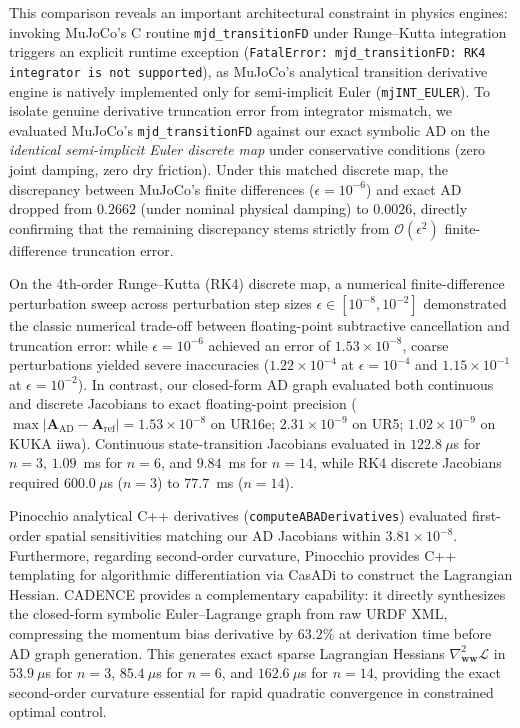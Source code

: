 \documentclass[fleqn,10pt]{article}
\begin{document}
This comparison reveals an important architectural constraint in physics engines: invoking MuJoCo's C routine \texttt{mjd\_transitionFD} under Runge--Kutta integration triggers an explicit runtime exception (\texttt{FatalError: mjd\_transitionFD: RK4 integrator is not supported}), as MuJoCo's analytical transition derivative engine is natively implemented only for semi-implicit Euler (\texttt{mjINT\_EULER}). To isolate genuine derivative truncation error from integrator mismatch, we evaluated MuJoCo's \texttt{mjd\_transitionFD} against our exact symbolic AD on the \textit{identical semi-implicit Euler discrete map} under conservative conditions (zero joint damping, zero dry friction). Under this matched discrete map, the discrepancy between MuJoCo's finite differences ($\epsilon = 10^{-6}$) and exact AD dropped from $0.2662$ (under nominal physical damping) to $0.0026$, directly confirming that the remaining discrepancy stems strictly from $\mathcal{O}(\epsilon^2)$ finite-difference truncation error.

On the 4th-order Runge--Kutta (RK4) discrete map, a numerical finite-difference perturbation sweep across perturbation step sizes $\epsilon \in [10^{-8}, 10^{-2}]$ demonstrated the classic numerical trade-off between floating-point subtractive cancellation and truncation error: while $\epsilon = 10^{-6}$ achieved an error of $1.53 \times 10^{-8}$, coarse perturbations yielded severe inaccuracies ($1.22 \times 10^{-4}$ at $\epsilon = 10^{-4}$ and $1.15 \times 10^{-1}$ at $\epsilon = 10^{-2}$). In contrast, our closed-form AD graph evaluated both continuous and discrete Jacobians to exact floating-point precision ($\max |\bm{A}_{\text{AD}} - \bm{A}_{\text{ref}}| = 1.53 \times 10^{-8}$ on UR16e; $2.31 \times 10^{-9}$ on UR5; $1.02 \times 10^{-9}$ on KUKA iiwa). Continuous state-transition Jacobians evaluated in $122.8~\mu$s for $n=3$, $1.09$~ms for $n=6$, and $9.84$~ms for $n=14$, while RK4 discrete Jacobians required $600.0~\mu$s ($n=3$) to $77.7$~ms ($n=14$).

Pinocchio analytical C++ derivatives (\texttt{computeABADerivatives}) evaluated first-order spatial sensitivities matching our AD Jacobians within $3.81 \times 10^{-8}$. Furthermore, regarding second-order curvature, Pinocchio provides C++ templating for algorithmic differentiation via CasADi to construct the Lagrangian Hessian. CADENCE provides a complementary capability: it directly synthesizes the closed-form symbolic Euler--Lagrange graph from raw URDF XML, compressing the momentum bias derivative by $63.2\%$ at derivation time before AD graph generation. This generates exact sparse Lagrangian Hessians $\nabla_{\bm{w}\bm{w}}^2 \mathcal{L}$ in $53.9~\mu$s for $n=3$, $85.4~\mu$s for $n=6$, and $162.6~\mu$s for $n=14$, providing the exact second-order curvature essential for rapid quadratic convergence in constrained optimal control.
\end{document}
